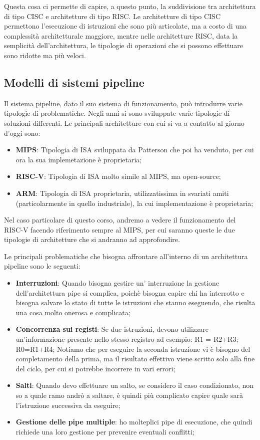 Questa cosa ci permette di capire, a questo punto, la suddivisione tra architettura di tipo CISC e architetture di tipo RISC. Le architetture di tipo CISC permettono l'esecuzione di istruzioni che sono più articolate, ma a costo di una complessità architetturale maggiore, mentre nelle architetture RISC, data la semplicità dell'architettura, le tipologie di operazioni che si possono effettuare sono ridotte ma più veloci.

\subsection{Modelli di sistemi pipeline}
Il sistema pipeline, dato il suo sistema di funzionamento, può introdurre varie tipologie di problematiche. Negli anni si sono sviluppate varie tipologie di soluzioni differenti.
Le principali architetture con cui si va a contatto al giorno d'oggi sono:
\begin{itemize}
    \item \textbf{MIPS}: Tipologia di ISA sviluppata da Patterson che poi ha venduto, per cui ora la sua implemetazione è proprietaria;
    \item \textbf{RISC-V}: Tipologia di ISA molto simile al MIPS, ma open-source;
    \item \textbf{ARM}: Tipologia di ISA proprietaria, utilizzatissima in svariati amiti (particolarmente in quello industriale), la cui implementazione è proprietaria;
\end{itemize}

Nel caso particolare di questo corso, andremo a vedere il funzionamento del RISC-V facendo riferimento sempre al MIPS, per cui saranno queste le due tipologie di architetture che si andranno ad approfondire.

Le principali problematiche che bisogna affrontare all'interno di un architettura pipeline sono le seguenti:
\begin{itemize}
    \item \textbf{Interruzioni}: Quando bisogna gestire un' interruzione la gestione dell'architettura pipe si complica, poichè bisogna capire chi ha interrotto e bisogna salvare lo stato di tutte le istruzioni che stanno eseguendo, che risulta una cosa molto onerosa e complicata;
    \item \textbf{Concorrenza sui registi}: Se due istruzioni, devono utilizzare un'informazione presente nello stesso registro ad esempio: R1 = R2+R3; R0=R1+R4;  Notiamo che per eseguire la seconda istruzione vi è bisogno del completamento della prima, ma il risultato effettivo viene scritto solo alla fine del ciclo, per cui si potrebbe incorrere in vari errori;
    \item \textbf{Salti}: Quando devo effettuare un salto, se considero il caso condizionato, non so a quale ramo andrò a saltare, è quindi più complicato capire quale sarà l'istruzione successiva da eseguire;
    \item \textbf{Gestione delle pipe multiple}: ho molteplici pipe di esecuzione, che quindi richiede una loro gestione per prevenire eventuali conflitti;
\end{itemize}

